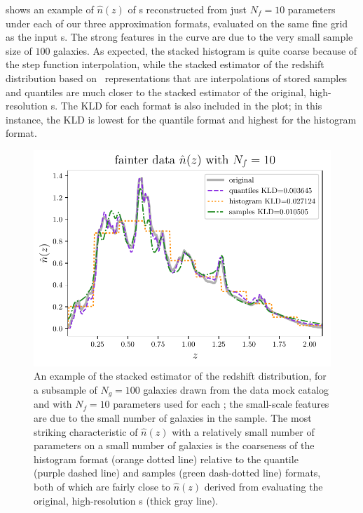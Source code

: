 shows an example of $\hat{n}(z)$ of \pz s 
reconstructed from just $N_{f}=10$ parameters under each of our three 
approximation formats, evaluated on the same fine grid as the input \pz s.
The strong features in the curve are due to the very small sample size of $100$ 
galaxies.
As expected, the stacked histogram is quite coarse because of the step function 
interpolation, while the stacked estimator of the redshift distribution based 
on \pz\ representations that are interpolations of stored samples and quantiles 
are much closer to the stacked estimator of the original, high-resolution \pz s.
The KLD for each format is also included in the plot; in this instance, the KLD 
is lowest for the quantile format and highest for the histogram format.

\begin{figure}
	\begin{center}
		\includegraphics[width=0.49\columnwidth]{figures/qp/stacked.pdf}
		\caption{An example of the stacked estimator of the redshift distribution, 
			for a subsample of $N_{g}=100$ galaxies drawn from the \ssdata data mock 
			catalog and with $N_{f}=10$ parameters used for each \pz; the small-scale 
			features are due to the small number of galaxies in the sample.
			The most striking characteristic of $\hat{n}(z)$ with a relatively small 
			number of parameters on a small number of galaxies is the coarseness of the 
			histogram format (orange dotted line) relative to the quantile (purple dashed 
			line) and samples (green dash-dotted line) formats, both of which are fairly 
			close to $\hat{n}(z)$ derived from evaluating the original, high-resolution \pz 
			s (thick gray line).
			}
	\end{center}
\end{figure}

